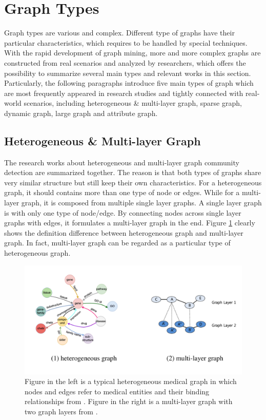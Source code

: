\section{Graph Types}
Graph types are various and complex. Different type of graphs have their particular characteristics, which requires to be handled by special techniques. With the rapid development of graph mining, more and more complex graphs are constructed from real scenarios and analyzed by researchers, which offers the possibility to summarize several main types and relevant works in this section. Particularly, the following paragraphs introduce five main types of graph which are most frequently appeared in research studies and tightly connected with real-world scenarios, including heterogeneous \& multi-layer graph, sparse graph, dynamic graph, large graph and attribute graph. 

\subsection{Heterogeneous \& Multi-layer Graph} 

The research works about heterogeneous and multi-layer graph community detection are summarized together. The reason is that both types of graphs share very similar structure but still keep their own characteristics. For a heterogeneous graph, it should contains more than one type of node or edges. While for a multi-layer graph, it is composed from multiple single layer graphs. A single layer graph is with only one type of node/edge.  By connecting nodes across single layer graphs with edges, it formulates a multi-layer graph in the end. Figure \ref{fig:c2_hetero} clearly shows the definition difference between heterogeneous graph and multi-layer graph. In fact, multi-layer graph can be regarded as a particular type of heterogeneous graph. 

\begin{figure}
	\center
	\includegraphics[width=\columnwidth]{img/chapter2/heterogenous.pdf} 
	\caption{Figure in the left is a typical heterogeneous medical graph in which nodes and edges refer to medical entities and their binding relationships from \cite{gao2019edge2vec}. Figure in the right is a multi-layer graph with two graph layers from \cite{kim2015community}.}
	\label{fig:c2_hetero}
\end{figure}  


